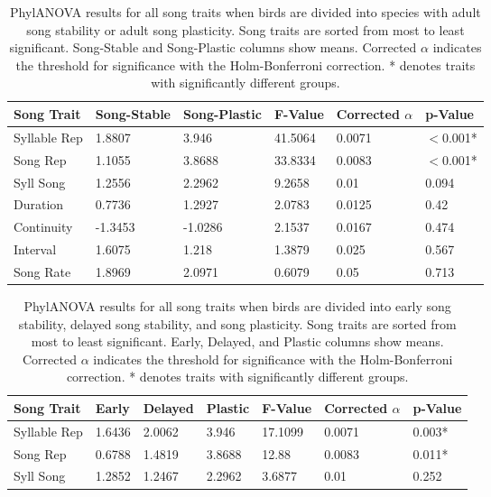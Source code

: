 \documentclass[a4paper,12pt]{article}
\begin{document}
    
\begin{table}[ht]
\caption{PhylANOVA results for all song traits when birds are divided into species with adult song stability or adult song plasticity.  Song traits are sorted from most to least significant.  Song-Stable and Song-Plastic columns show means.  Corrected $\alpha$ indicates the threshold for significance with the Holm-Bonferroni correction. * denotes traits with significantly different groups.}
\centering
\begin{tabular}{llllll}
  \hline
Song Trait & Song-Stable & Song-Plastic & F-Value & Corrected $\alpha$ & p-Value \\ 
  \hline
Syllable Rep & 1.8807 & 3.946 & 41.5064 & 0.0071 &$<$0.001* \\ 
  Song Rep & 1.1055 & 3.8688 & 33.8334 & 0.0083 &$<$0.001* \\ 
  Syll Song & 1.2556 & 2.2962 & 9.2658 & 0.01 & 0.094 \\ 
  Duration & 0.7736 & 1.2927 & 2.0783 & 0.0125 & 0.42 \\ 
  Continuity & -1.3453 & -1.0286 & 2.1537 & 0.0167 & 0.474 \\ 
  Interval & 1.6075 & 1.218 & 1.3879 & 0.025 & 0.567 \\ 
  Song Rate & 1.8969 & 2.0971 & 0.6079 & 0.05 & 0.713 \\ 
   \hline
\end{tabular}
\end{table}



\begin{table}[ht]
\caption{PhylANOVA results for all song traits when birds are divided into early song stability, delayed song stability, and song plasticity.  Song traits are sorted from most to least significant.  Early, Delayed, and Plastic columns show means.  Corrected $\alpha$ indicates the threshold for significance with the Holm-Bonferroni correction.  * denotes traits with significantly different groups.}
\centering
\begin{tabular}{lllllll}
  \hline
Song Trait & Early & Delayed & Plastic & F-Value & Corrected $\alpha$ & p-Value \\ 
  \hline
Syllable Rep & 1.6436 & 2.0062 & 3.946 & 17.1099 & 0.0071 & 0.003* \\ 
  Song Rep & 0.6788 & 1.4819 & 3.8688 & 12.88 & 0.0083 & 0.011* \\ 
  Syll Song & 1.2852 & 1.2467 & 2.2962 & 3.6877 & 0.01 & 0.252 \\ 
   \hline
\end{tabular}
\end{table}
\end{document}
